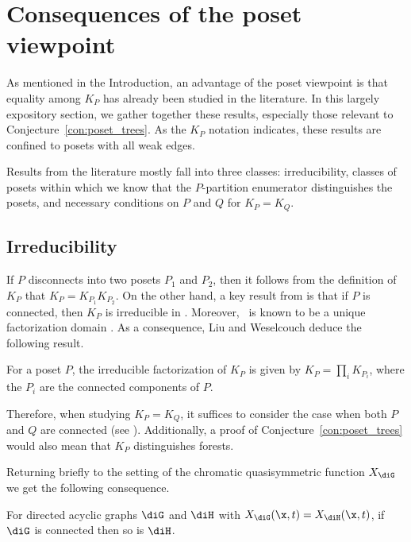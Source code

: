 \section{Consequences of the poset viewpoint}\label{sec:poset_results}

As mentioned in the Introduction, an advantage of the poset viewpoint is that equality among $K_P$ has already been studied in the literature.  In this largely expository section, we gather together these results, especially those relevant to Conjecture~\ref{con:poset_trees}.  As the $K_P$ notation indicates, these results are confined to posets with all weak edges.

Results from the literature mostly fall into three classes: irreducibility, classes of posets within which we know that the $P$-partition enumerator distinguishes the posets, and necessary conditions on $P$ and $Q$ for $K_P = K_Q$.  

\subsection{Irreducibility}

If $P$ disconnects into two posets $P_1$ and $P_2$, then it follows from the definition of $K_P$ that $K_P = K_{P_1}K_{P_2}$.  On the other hand, a key result from \cite{LiWe21} is that if $P$ is connected, then $K_P$ is irreducible in \qsym.  Moreover, \qsym\ is known to be a unique factorization domain \cite{Haz01,LaPy08,MaRe95}.  As a consequence, Liu and Weselcouch deduce the following result.

\begin{corollary}\label{cor:factors}
For a poset $P$, the irreducible factorization of $K_P$ is given by $K_P = \prod_i K_{P_i}$, where the $P_i$ are the connected components of $P$.
\end{corollary}

Therefore, when studying $K_P = K_Q$, it suffices to consider the case when both $P$ and $Q$ are connected (see \cite[Corollary~4.21]{LiWe21}).  Additionally, a proof of Conjecture~\ref{con:poset_trees} would also mean that $K_P$ distinguishes forests.

Returning briefly to the setting of the chromatic quasisymmetric function $X_{\diG}$ we get the following consequence.  

\begin{proposition}
For directed acyclic graphs $\diG$ and $\diH$ with $X_{\diG}(\x,t) = X_{\diH}(\x,t)$, if $\diG$ is connected then so is $\diH$.
\end{proposition}

